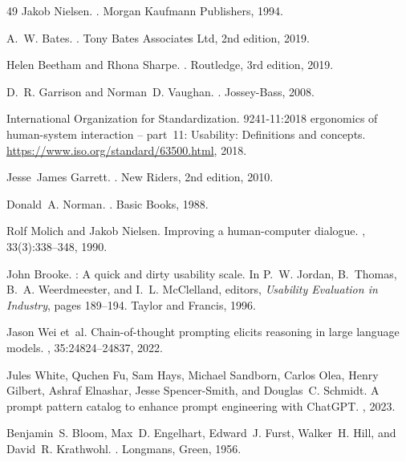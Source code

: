 \begin{thebibliography}{49}
Jakob Nielsen.
.
\newblock Morgan Kaufmann Publishers, 1994.

A.~W. Bates.
.
\newblock Tony Bates Associates Ltd, 2nd edition, 2019.

Helen Beetham and Rhona Sharpe.
.
\newblock Routledge, 3rd edition, 2019.

D.~R. Garrison and Norman~D. Vaughan.
.
\newblock Jossey-Bass, 2008.

{International Organization for Standardization}.
 9241-11:2018 ergonomics of human-system interaction -- part~11: Usability: Definitions and concepts.
\newblock \url{https://www.iso.org/standard/63500.html}, 2018.

Jesse~James Garrett.
.
\newblock New Riders, 2nd edition, 2010.

Donald~A. Norman.
.
\newblock Basic Books, 1988.

Rolf Molich and Jakob Nielsen.
\newblock Improving a human-computer dialogue.
, 33(3):338--348, 1990.

John Brooke.
: A quick and dirty usability scale.
\newblock In P.~W. Jordan, B.~Thomas, B.~A. Weerdmeester, and I.~L. McClelland, editors, {\em Usability Evaluation in Industry}, pages 189--194. Taylor and Francis, 1996.

Jason Wei et~al.
\newblock Chain-of-thought prompting elicits reasoning in large language models.
, 35:24824--24837, 2022.

Jules White, Quchen Fu, Sam Hays, Michael Sandborn, Carlos Olea, Henry Gilbert, Ashraf Elnashar, Jesse Spencer-Smith, and Douglas~C. Schmidt.
\newblock A prompt pattern catalog to enhance prompt engineering with {ChatGPT}.
, 2023.

Benjamin~S. Bloom, Max~D. Engelhart, Edward~J. Furst, Walker~H. Hill, and David~R. Krathwohl.
.
\newblock Longmans, Green, 1956.


\end{thebibliography}
